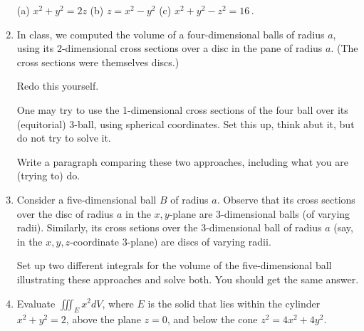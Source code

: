 \documentclass[12pt]{article}
\begin{document}
\begin{enumerate}
  (a) $x^2+y^2=2z$ \qquad
  (b) $z=x^2-y^2$\qquad
  (c) $x^2+y^2-z^2=16$\,.
\vspace{-2pt}
   

\item In class, we computed the volume of a four-dimensional balls of radius $a$, using its 2-dimensional cross sections over
  a disc in the pane of radius $a$.   (The cross sections were themselves discs.)

  Redo this yourself.

  
  One may try to use the 1-dimensional cross sections of the four ball over its (equitorial) 3-ball, using spherical coordinates.
  Set this up, think abut it, but do not try to solve it.

  Write a paragraph comparing these two approaches, including what you are (trying to) do.
\vspace{-2pt}
   
   
\item
  Consider a  five-dimensional ball $B$ of radius $a$.
  Observe that its cross sections over the disc of radius $a$ in the $x,y$-plane are 3-dimensional balls (of varying radii).
  Similarly, its cross setions over the 3-dimensional ball of radius $a$ (say, in the $x,y,z$-coordinate 3-plane) are discs of varying
  radii.
  
  Set up two different integrals for the volume of the five-dimensional ball illustrating these approaches and solve both.
  You should get the same answer.  
\vspace{-2pt}
   

\item  Evaluate $\iiint_E x^2 dV$, where $E$ is the solid that lies within the cylinder $x^2+y^2=2$, above the plane $z=0$,
  and below the 
  cone $z^2=4x^2+4y^2$.
\vspace{-2pt}
   

\end{enumerate}
\end{document}
